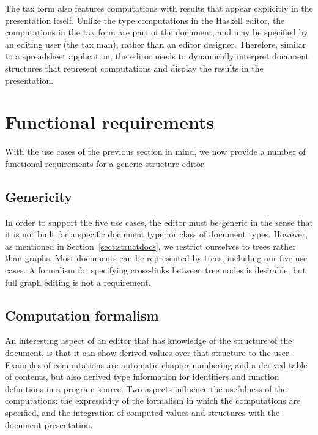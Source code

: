 The tax form also features computations with results that appear explicitly in the presentation itself. Unlike the type computations in the Haskell editor, the computations in the tax form are part of the document, and may be specified by an editing user (the tax man), rather than an editor designer. Therefore, similar to a spreadsheet application, the editor needs to dynamically interpret document structures that represent computations and display the results in the presentation. 

%																
%																
%																
\section{Functional requirements} \label{sect:reqs}

With the use cases of the previous section in mind, we now provide a number of functional requirements for a generic structure editor. 


%																
\subsection{Genericity}

In order to support the five use cases, the editor must be generic in the sense that it is not built for a specific document type, or class of document types. However, as mentioned in Section~\ref{sect:structdocs}, we restrict ourselves to trees rather than graphs. Most documents can be represented by trees, including our five use cases. A formalism for specifying cross-links between tree nodes is desirable, but full graph editing is not a requirement.



%																
\subsection{Computation formalism}

An interesting aspect of an editor that has knowledge of the structure of the document, is that it can show derived values over that structure to the user. Examples of computations are automatic chapter numbering and a derived table of contents, but also derived type information for identifiers and function definitions in a program source. Two aspects influence the usefulness of the computations: the expressivity of the formalism in which the computations are specified, and the integration of computed values and structures with the document presentation.

